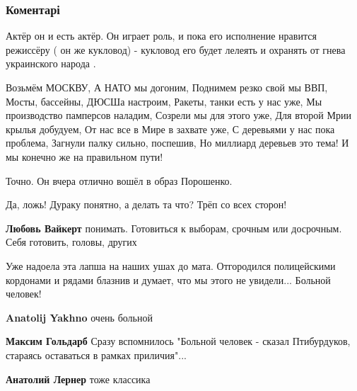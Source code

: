  
 
 
 
 
\subsubsection{Коментарі}
\label{sec:02_12_2021.fb.goldarb_maksim.1.doklad_zelja_voland.cmt}

\begin{itemize} %

Актёр он и есть актёр. Он играет роль, и пока его исполнение нравится режиссёру
( он же кукловод) - кукловод его будет лелеять и охранять от гнева украинского
народа .


\obeycr
Возьмём МОСКВУ,
А НАТО мы догоним,
Поднимем резко свой мы ВВП,
Мосты, бассейны, ДЮСШа настроим,
Ракеты, танки есть у нас уже,
Мы производство памперсов наладим,
Созрели мы для этого уже,
Для второй Мрии крылья добудуем,
От нас все в Мире в захвате уже,
С деревьями у нас пока проблема,
Загнули палку сильно, поспешив,
Но миллиард деревьев это тема!
И мы конечно же на правильном пути!
\restorecr

Точно. Он вчера отлично вошёл в образ Порошенко.

Да, ложь! Дураку понятно, а делать та что? Трёп со всех сторон!

\begin{itemize} %
\textbf{Любовь Вайкерт} понимать. Готовиться к выборам, срочным или досрочным. Себя готовить, головы, других
\end{itemize} %


Уже надоела эта лапша на наших ушах до мата. Отгородился полицейскими кордонами
и рядами блазнив и думает, что мы этого не увидели... Больной человек!

\begin{itemize} %
\textbf{Anatolij Yakhno} очень больной

\textbf{Максим Гольдарб} Сразу вспомнилось "Больной человек - сказал Птибурдуков, стараясь оставаться в рамках приличия"...

\textbf{Анатолий Лернер} тоже классика
\end{itemize} %

\end{itemize} %
